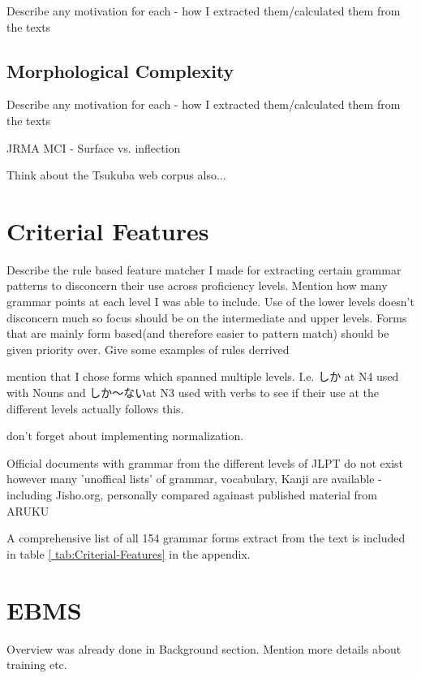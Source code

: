 Describe any motivation for each - how I extracted them/calculated them from the texts
\subsection{Morphological Complexity}
Describe any motivation for each - how I extracted them/calculated them from the texts

JRMA
MCI  - Surface vs. inflection


 Think
about the Tsukuba web corpus also...


\section{Criterial Features}

Describe the rule based feature matcher I made for extracting certain grammar patterns to disconcern their use
across proficiency levels. Mention how many grammar points at each level I was able to include. Use of the lower
levels doesn't disconcern much so focus should be on the intermediate and upper levels.  Forms that are mainly form
based(and therefore easier to pattern match) should be given priority over. Give some examples of rules derrived

mention that I chose forms which spanned multiple levels. I.e. しか at N4 used with Nouns and しか〜ないat N3 used
with verbs to see if their use at the different levels actually follows this.

don't forget about implementing normalization.

Official documents with grammar from the different levels of JLPT do not exist however many 'unoffical lists' of
grammar, vocabulary, Kanji are available - including Jisho.org, personally compared againast published material from
ARUKU

A comprehensive list of all 154 grammar forms extract from the text is included in table \ref{
tab:Criterial-Features} in the appendix.


\section{EBMS}

 Overview was already done in Background section. Mention more details about training etc.


